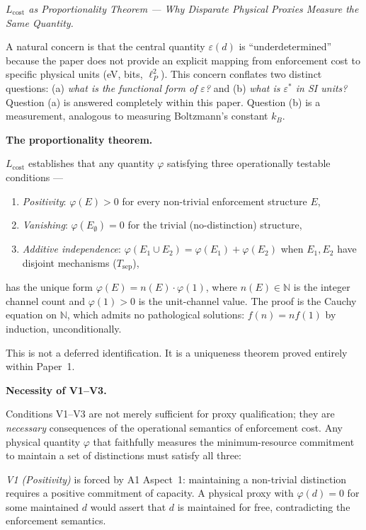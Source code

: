 \documentclass[11pt]{article}
\theoremstyle{remark}
\begin{document}
\medskip\noindent\textit{$L_{\mathrm{cost}}$ as Proportionality Theorem --- Why Disparate Physical Proxies Measure the Same Quantity.}
\label{box:Lcost_proportionality}

A natural concern is that the central quantity $\varepsilon(d)$ is ``underdetermined'' because the paper does not provide an explicit mapping from enforcement cost to specific physical units (eV, bits, $\ell_P^2$).  This concern conflates two distinct questions: (a) \emph{what is the functional form of $\varepsilon$?} and (b) \emph{what is $\varepsilon^*$ in SI units?}  Question (a) is answered completely within this paper.  Question (b) is a measurement, analogous to measuring Boltzmann's constant $k_B$.

\medskip\noindent\textbf{The proportionality theorem.}

$L_{\mathrm{cost}}$ establishes that any quantity $\varphi$ satisfying three operationally testable conditions ---
\begin{enumerate}[nosep,leftmargin=2em,itemsep=2pt]
\item \textit{Positivity}: $\varphi(E) > 0$ for every non-trivial enforcement structure $E$,
\item \textit{Vanishing}: $\varphi(E_\emptyset) = 0$ for the trivial (no-distinction) structure,
\item \textit{Additive independence}: $\varphi(E_1 \cup E_2) = \varphi(E_1) + \varphi(E_2)$ when $E_1, E_2$ have disjoint mechanisms ($T_{\mathrm{sep}}$),
\end{enumerate}
has the unique form $\varphi(E) = n(E) \cdot \varphi(1)$, where $n(E) \in \mathbb{N}$ is the integer channel count and $\varphi(1) > 0$ is the unit-channel value.  The proof is the Cauchy equation on $\mathbb{N}$, which admits no pathological solutions: $f(n) = n f(1)$ by induction, unconditionally.

This is not a deferred identification.  It is a uniqueness theorem proved entirely within Paper~1.

\medskip\noindent\textbf{Necessity of V1--V3.}

Conditions V1--V3 are not merely sufficient for proxy qualification; they are \emph{necessary} consequences of the operational semantics of enforcement cost.  Any physical quantity $\varphi$ that faithfully measures the minimum-resource commitment to maintain a set of distinctions must satisfy all three:

\smallskip\noindent\textit{V1 (Positivity)} is forced by A1 Aspect~1: maintaining a non-trivial distinction requires a positive commitment of capacity.  A physical proxy with $\varphi(d) = 0$ for some maintained $d$ would assert that $d$ is maintained for free, contradicting the enforcement semantics.
\end{document}
